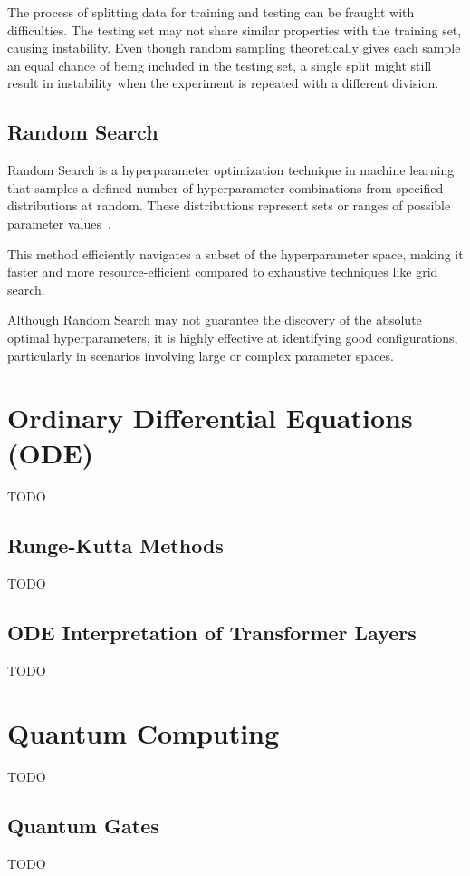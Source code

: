 \documentclass[12pt,a4paper]{report}
\begin{document}
The process of splitting data for training and testing can be fraught with difficulties. The testing set may not share similar properties with the training set, causing instability. Even though random sampling theoretically gives each sample an equal chance of being included in the testing set, a single split might still result in instability when the experiment is repeated with a different division.


\subsection{Random Search}
Random Search is a hyperparameter optimization technique in machine learning that samples a defined number of hyperparameter combinations from specified distributions at random. These distributions represent sets or ranges of possible parameter values~\cite{randomsearch}.

This method efficiently navigates a subset of the hyperparameter space, making it faster and more resource-efficient compared to exhaustive techniques like grid search.

Although Random Search may not guarantee the discovery of the absolute optimal hyperparameters, it is highly effective at identifying good configurations, particularly in scenarios involving large or complex parameter spaces.

\section{Ordinary Differential Equations (ODE)}
TODO

\subsection{Runge-Kutta Methods}
TODO

\subsection{ODE Interpretation of Transformer Layers}
TODO

\section{Quantum Computing}
TODO

\subsection{Quantum Gates}
TODO
\end{document}
